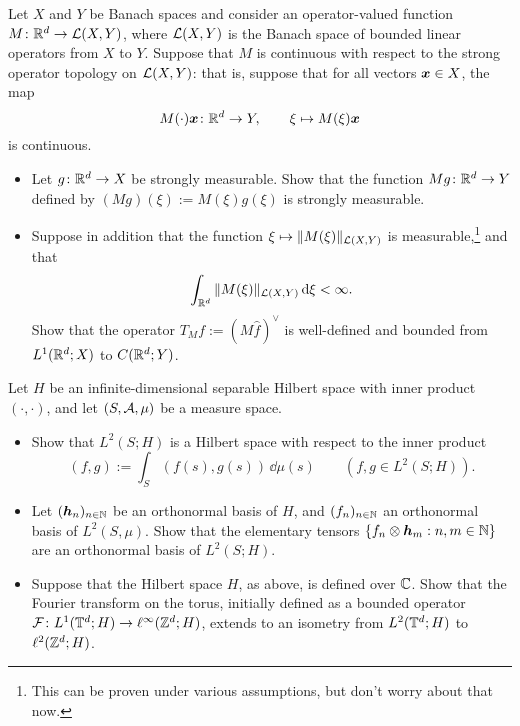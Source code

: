 \begin{exercise}
  Let $X$ and $Y$ be Banach spaces and consider an operator-valued function $M \colon \mathbb{R}^d \rightarrow \mathcal{L}(X,Y)$, where $\mathcal{L}(X,Y)$ is the Banach space of bounded linear operators from $X$ to $Y$.
  Suppose that $M$ is continuous with respect to the strong operator topology on $\mathcal{L}(X,Y)$: that is, suppose that for all vectors $\bm{x} \in X$, the map
  \begin{equation*}
    M(\cdot)\bm{x} \colon \mathbb{R}^d \rightarrow Y, \qquad \xi \mapsto M(\xi)\bm{x}
  \end{equation*}
  is continuous.
  \begin{itemize}
  \item
    Let $g \colon \mathbb{R}^d \rightarrow X$ be strongly measurable.
    Show that the function $Mg \colon \mathbb{R}^d \rightarrow Y$ defined by $(Mg)(\xi) := M(\xi)g(\xi)$ is strongly measurable.
  \item
    Suppose in addition that the function $\xi \mapsto \|M(\xi)\|_{\mathcal{L}(X,Y)}$ is measurable,\footnote{This can be proven under various assumptions, but don't worry about that now.} and that
    \begin{equation*}
      \int_{\mathbb{R}^d} \|M(\xi)\|_{\mathcal{L}(X,Y)} \, \mathrm{d} \xi < \infty.
    \end{equation*}
    Show that the operator $T_Mf := (M\hat{f})^\vee$ is well-defined and bounded from $L^1(\mathbb{R}^d;X)$ to $C(\mathbb{R}^d;Y)$.
  \end{itemize}
\end{exercise}

\begin{exercise}
  Let $H$ be an infinite-dimensional separable Hilbert space with inner product $(\cdot , \cdot)$, and let $(S,\mathcal{A},\mu)$ be a measure space.
  \begin{itemize}
  \item Show that $L^2(S;H)$ is a Hilbert space with respect to the inner product
    \begin{equation*}
      (f, g) := \int_{S} (f(s), g(s)) \, \dd\mu(s) \qquad (f,g \in L^2(S;H)).
    \end{equation*}
  \item Let $(\bm{h}_n)_{n \in \mathbb{N}}$ be an orthonormal basis of $H$, and $(f_n)_{n \in \mathbb{N}}$ an orthonormal basis of $L^2(S,\mu)$.
    Show that the elementary tensors $\{f_n \otimes \bm{h}_m : n,m \in \mathbb{N}\}$ are an orthonormal basis of $L^2(S;H)$.
  \item Suppose that the Hilbert space $H$, as above, is defined over $\mathbb{C}$.
    Show that the Fourier transform on the torus, initially defined as a bounded operator $\mathcal{F} \colon L^1(\mathbb{T}^d;H) \rightarrow \ell^\infty(\mathbb{Z}^d;H)$, extends to an isometry from $L^2(\mathbb{T}^d;H)$ to $\ell^2(\mathbb{Z}^d;H)$.
  \end{itemize}
\end{exercise}

